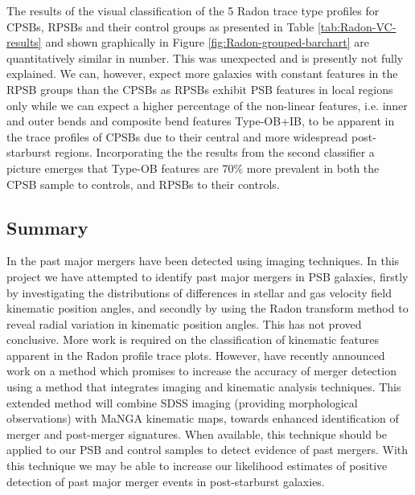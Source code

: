 The results of the visual classification of the 5 Radon trace type profiles for CPSBs, RPSBs and their control groups as presented in Table \ref{tab:Radon-VC-results} and shown graphically in Figure \ref{fig:Radon-grouped-barchart} are quantitatively similar in number. This was unexpected and is presently not fully explained. We can, however, expect more galaxies with constant features in the RPSB groups than the CPSBs as RPSBs exhibit PSB features in local regions only while we can expect a higher percentage of the non-linear features, i.e. inner and outer bends and composite bend features Type-OB+IB, to be apparent in the trace profiles of CPSBs due to their central and more widespread post-starburst regions. Incorporating the the results from the second classifier a picture emerges that Type-OB features are 70\% more prevalent in both the CPSB sample to controls, and RPSBs to their controls. 




\subsection{Summary}
\label{summary}
In the past major mergers have been detected using imaging techniques. In this project we have attempted to identify past major mergers in PSB galaxies, firstly by investigating the distributions of differences in stellar and gas velocity field kinematic position angles, and secondly by using the Radon transform method to reveal radial variation in kinematic position angles. This has not proved conclusive. More work is required on the classification of kinematic features apparent in the Radon profile trace plots. However, \cite{2019DDA....5020304N} have recently announced work on a method which promises to increase the accuracy of merger detection using a method that integrates imaging and kinematic analysis techniques. This extended method will combine SDSS imaging (providing morphological observations) with MaNGA  kinematic maps, towards enhanced identification of merger and post-merger signatures. When available, this technique should be applied to our PSB and control samples to detect evidence of past mergers. With this technique we may be able to increase our likelihood estimates of positive detection of past major merger events in post-starburst galaxies.

